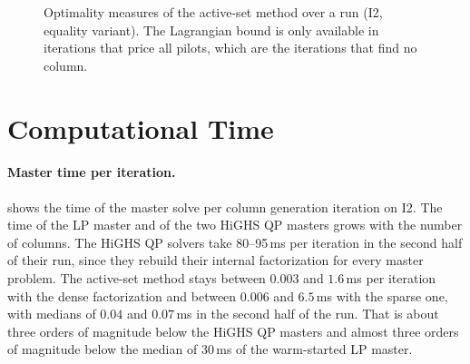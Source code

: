 \begin{figure}[ht]
\centering
{}
\caption{Optimality measures of the active-set method over a run (I2, equality variant). The
Lagrangian bound is only available in iterations that price all pilots, which are the
iterations that find no column.}
\label{fig:optimality}
\end{figure}


\section{Computational Time}
\label{sec:results-time}

\paragraph{Master time per iteration.}  shows the time of the master
solve per column generation iteration on I2. The time of the LP master and of the two HiGHS QP
masters grows with the number of columns. The HiGHS QP solvers take 80--95\,ms per iteration
in the second half of their run, since they rebuild their internal factorization for every
master problem. The active-set method stays between $0.003$ and $1.6$\,ms per iteration with
the dense factorization and between $0.006$ and $6.5$\,ms with the sparse one, with medians
of $0.04$ and $0.07$\,ms in the second half of the run. That is about three orders of
magnitude below the HiGHS QP masters and almost three orders of magnitude below the median of
$30$\,ms of the warm-started LP master.


